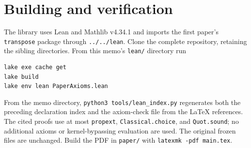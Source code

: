 \section{Building and verification}\label{sec:verification}
The library uses Lean and Mathlib v4.34.1 and imports the first paper's
\texttt{transpose} package through \texttt{../../lean}. Clone the complete
repository, retaining the sibling directories. From this memo's
\texttt{lean/} directory run
\begin{verbatim}
lake exe cache get
lake build
lake env lean PaperAxioms.lean
\end{verbatim}
From the memo directory, \texttt{python3 tools/lean\_index.py} regenerates
both the preceding declaration index and the axiom-check file from the
LaTeX references. The cited proofs use at most \texttt{propext},
\texttt{Classical.choice}, and \texttt{Quot.sound}; no additional axioms or
kernel-bypassing evaluation are used. The original frozen files are unchanged.
Build the PDF in \texttt{paper/} with \texttt{latexmk -pdf main.tex}.
